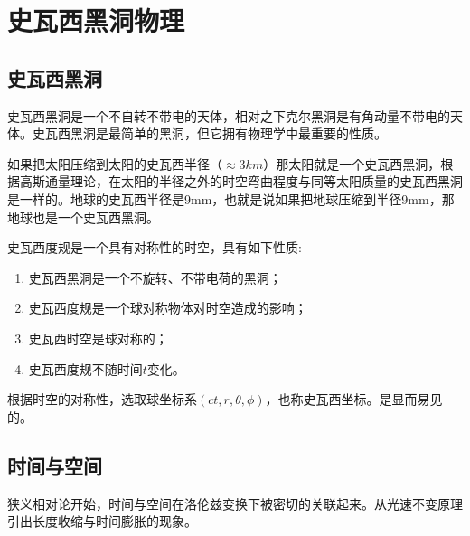 %
%
%
%
%
%

\chapter{史瓦西黑洞物理}

\section{史瓦西黑洞}
史瓦西黑洞是一个不自转不带电的天体，相对之下克尔黑洞是有角动量不带电的天体。史瓦西黑洞是最简单的黑洞，但它拥有物理学中最重要的性质。

如果把太阳压缩到太阳的史瓦西半径（$\approx3km$）那太阳就是一个史瓦西黑洞，根据高斯通量理论，在太阳的半径之外的时空弯曲程度与同等太阳质量的史瓦西黑洞是一样的。地球的史瓦西半径是9mm，也就是说如果把地球压缩到半径9mm，那地球也是一个史瓦西黑洞。

史瓦西度规是一个具有对称性的时空，具有如下性质:
\begin{enumerate}
    \item 史瓦西黑洞是一个不旋转、不带电荷的黑洞；
    \item 史瓦西度规是一个球对称物体对时空造成的影响；
    \item 史瓦西时空是球对称的；
    \item 史瓦西度规不随时间$t$变化。
\end{enumerate}

根据时空的对称性，选取球坐标系$\left(ct,r,\theta,\phi\right)$，也称史瓦西坐标。是显而易见的。

\section{时间与空间}
狭义相对论开始，时间与空间在洛伦兹变换下被密切的关联起来。从光速不变原理引出长度收缩与时间膨胀的现象。

